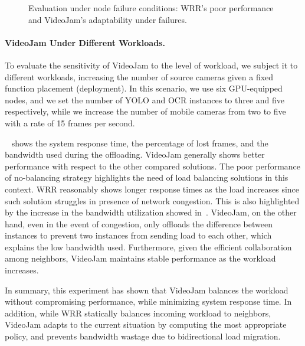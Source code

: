 \begin{figure}[htb]
\begin{minipage}[t]{.32\linewidth}
		\label{fig:adaptability_response_time}
	\end{minipage}
	\vspace{-1mm}
	\caption{Evaluation under node failure conditions: WRR's poor performance and VideoJam's adaptability under failures.}
	\vspace{-3mm}
	\label{fig:adaptability}
\end{figure}


\paragraph{VideoJam Under Different Workloads.} To evaluate the sensitivity of VideoJam to the level of workload, we subject it to different workloads, increasing the number of source cameras given a fixed function placement (deployment). In this scenario, we use six GPU-equipped nodes, and we set the number of YOLO and OCR instances to three and five respectively, while we increase the number of mobile cameras from two to five with a rate of 15 frames per second. 

~ shows the system response time, the percentage of lost frames, and the bandwidth used during the offloading. VideoJam generally shows better performance with respect to the other compared solutions. The poor performance of no-balancing strategy highlights the need of load balancing solutions in this context. WRR reasonably shows longer response times as the load increases since such solution struggles in presence of network congestion. This is also highlighted by the increase in the bandwidth utilization showed in~. VideoJam, on the other hand, even in the event of congestion, only offloads the difference between instances to prevent two instances from sending load to each other, which explains the low bandwidth used. Furthermore, given the efficient collaboration among neighbors, VideoJam maintains stable performance as the workload increases.

In summary, this experiment has shown that VideoJam balances the workload without compromising performance, while minimizing system response time. In addition, while WRR statically balances incoming workload to neighbors, VideoJam adapts to the current situation by computing the most appropriate policy, and prevents bandwidth wastage due to bidirectional load migration.



